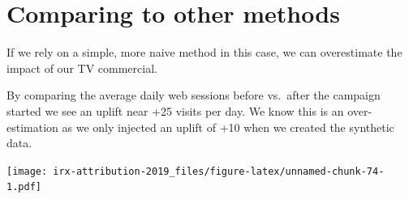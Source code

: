 \documentclass[]{book}
\begin{document}
\section{Comparing to other methods}\label{comparing-to-other-methods}

If we rely on a simple, more naive method in this case, we can
overestimate the impact of our TV commercial.

By comparing the average daily web sessions before vs.~after the
campaign started we see an uplift near +25 visits per day. We know this
is an over-estimation as we only injected an uplift of +10 when we
created the synthetic data.

\texttt{[image: irx-attribution-2019\_files/figure-latex/unnamed-chunk-74-1.pdf]}


\end{document}

